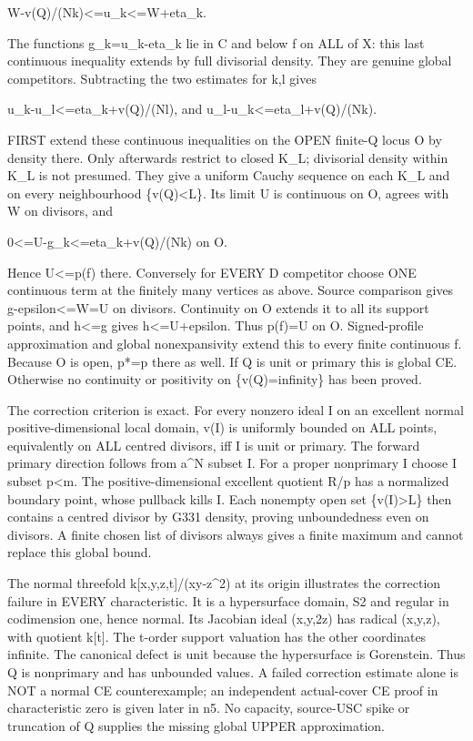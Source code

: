 \documentclass[11pt]{article}
\begin{document}
W-v(Q)/(Nk)<=u\_k<=W+eta\_k.

The functions g\_k=u\_k-eta\_k lie in C and below f on ALL of X: this last continuous inequality extends by full divisorial density. They are genuine global competitors. Subtracting the two estimates for k,l gives

u\_k-u\_l<=eta\_k+v(Q)/(Nl), and u\_l-u\_k<=eta\_l+v(Q)/(Nk).

FIRST extend these continuous inequalities on the OPEN finite-Q locus O by density there. Only afterwards restrict to closed K\_L; divisorial density within K\_L is not presumed. They give a uniform Cauchy sequence on each K\_L and on every neighbourhood \{v(Q)<L\}. Its limit U is continuous on O, agrees with W on divisors, and

0<=U-g\_k<=eta\_k+v(Q)/(Nk) on O.

Hence U<=p(f) there. Conversely for EVERY D competitor choose ONE continuous term at the finitely many vertices as above. Source comparison gives g-epsilon<=W=U on divisors. Continuity on O extends it to all its support points, and h<=g gives h<=U+epsilon. Thus p(f)=U on O. Signed-profile approximation and global nonexpansivity extend this to every finite continuous f. Because O is open, p*=p there as well. If Q is unit or primary this is global CE. Otherwise no continuity or positivity on \{v(Q)=infinity\} has been proved.

The correction criterion is exact. For every nonzero ideal I on an excellent normal positive-dimensional local domain, v(I) is uniformly bounded on ALL points, equivalently on ALL centred divisors, iff I is unit or primary. The forward primary direction follows from a\textasciicircum{}N subset I. For a proper nonprimary I choose I subset p<m. The positive-dimensional excellent quotient R/p has a normalized boundary point, whose pullback kills I. Each nonempty open set \{v(I)>L\} then contains a centred divisor by G331 density, proving unboundedness even on divisors. A finite chosen list of divisors always gives a finite maximum and cannot replace this global bound.

The normal threefold k[x,y,z,t]/(xy-z\textasciicircum{}2) at its origin illustrates the correction failure in EVERY characteristic. It is a hypersurface domain, S2 and regular in codimension one, hence normal. Its Jacobian ideal (x,y,2z) has radical (x,y,z), with quotient k[t]. The t-order support valuation has the other coordinates infinite. The canonical defect is unit because the hypersurface is Gorenstein. Thus Q is nonprimary and has unbounded values. A failed correction estimate alone is NOT a normal CE counterexample; an independent actual-cover CE proof in characteristic zero is given later in n5. No capacity, source-USC spike or truncation of Q supplies the missing global UPPER approximation.
\end{document}
